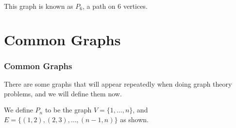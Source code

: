 \documentclass[11pt, mathserif]{beamer}
\theoremstyle{definition}
\theoremstyle{remark}
\begin{document}
\begin{frame}
\begin{example}[Path]
\begin{center}
\begin{tikzpicture}[x=0.75pt,y=0.75pt,yscale=-1,xscale=1]
  
        \end{tikzpicture}
  
    \end{center}
    This graph is known as $P_6$, a path on 6 vertices.
  \end{example}

\end{frame}

\section{Common Graphs}

\begin{frame}
  \frametitle{Common Graphs}

  There are some graphs that will appear repeatedly when doing graph theory problems, and we will define them now.
  
  \pause

  \vspace*{1.25cm}

  \begin{definition}[Path]
    We define $P_n$ to be the graph 
    $V = \{1, \dots, n\}$, and $E = \{(1, 2), (2, 3), \dots, (n - 1, n)\}$ as shown.
    \begin{center}
      
  
  
        \begin{tikzpicture}[x=0.75pt,y=0.75pt,yscale=-1,xscale=1]
  

\end{tikzpicture}
\end{center}
\end{definition}
\end{frame}
\end{document}
